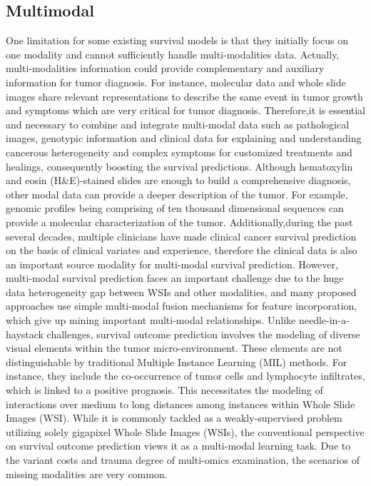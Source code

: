 \documentclass[journal,twoside,web]{ieeecolor}
\begin{document}
\subsection{Multimodal}
One limitation for some existing survival models is that they initially focus on one modality and cannot sufficiently handle multi-modalities data. 
Actually, multi-modalities information could provide complementary and auxiliary information for tumor diagnosis.
For instance, molecular data and whole slide images share relevant representations to describe the same event in tumor growth and symptoms which are very critical for tumor diagnosis.
Therefore,it is essential and necessary to combine and integrate multi-modal data such as pathological images, genotypic information and clinical data for explaining and understanding cancerous heterogeneity and complex symptoms for customized treatments and healings, consequently boosting the survival predictions.
Although hematoxylin and eosin (H\&E)-stained slides are enough to build a comprehensive diagnosis, other modal data can provide a deeper description of the tumor. For example, genomic profiles being comprising of ten thousand dimensional sequences can provide a molecular characterization of the tumor.
Additionally,during the past several decades, multiple clinicians have made clinical cancer survival prediction on the basis of clinical variates and experience, therefore the clinical data is also an important source modality for multi-modal survival prediction.
However, multi-modal survival prediction faces an important challenge due to the huge data heterogeneity gap between WSIs and other modalities, and many proposed approaches use simple multi-modal fusion mechanisms for feature incorporation, which give up mining important multi-modal relationships.
Unlike needle-in-a-haystack challenges, survival outcome prediction involves the modeling of diverse visual elements within the tumor micro-environment. 
These elements are not distinguishable by traditional Multiple Instance Learning (MIL) methods. 
For instance, they include the co-occurrence of tumor cells and lymphocyte infiltrates, which is linked to a positive prognosis. 
This necessitates the modeling of interactions over medium to long distances among instances within Whole Slide Images (WSI).
While it is commonly tackled as a weakly-supervised problem utilizing solely gigapixel Whole Slide Images (WSIs), the conventional perspective on survival outcome prediction views it as a multi-modal learning task.
Due to the variant costs and trauma degree of multi-omics examination, the scenarios of missing modalities are very common.  
\end{document}
